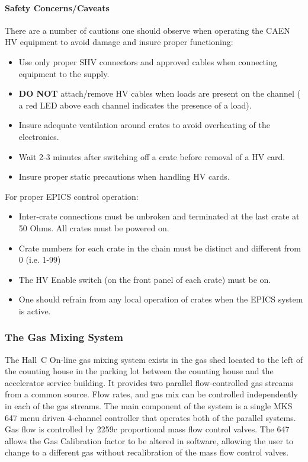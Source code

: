 \paragraph{Safety Concerns/Caveats}

There are a number of cautions one should observe when operating
the CAEN HV equipment to avoid damage and insure proper functioning:

\begin{itemize}
\item{Use only proper SHV connectors and approved cables when
connecting equipment to the supply.}
\item{{\bf DO NOT} attach/remove HV cables when loads are present on the
channel ( a red LED above each channel indicates the presence of a
load).}
\item{Insure adequate ventilation around crates to avoid overheating
of the electronics.}
\item{Wait 2-3 minutes after switching off a crate before removal of a
HV card.}
\item{Insure proper static precautions when handling HV cards.}
\end{itemize}

For proper EPICS control operation:

\begin{itemize}
\item{Inter-crate connections must be unbroken and terminated at the
last crate at 50 Ohms.  All crates must be powered on.}
\item{Crate numbers for each crate in the chain must be distinct and
different from 0 (i.e. 1-99)}
\item{The HV Enable switch (on the front panel of each crate) must be on.}
\item{One should refrain from any local operation of crates when the
EPICS system is active.}
\end{itemize}

\subsubsection{The Gas Mixing System}

The Hall~C On-line gas mixing system exists in the gas shed located
to the left of the counting house in the parking lot between the counting house
and the accelerator service building.
It provides two parallel
flow-controlled gas streams from a common source.  Flow rates, and gas mix
can be controlled independently in each of the gas streams.  The main
component of the system is a single MKS 647 menu driven 4-channel
controller that operates both of the parallel systems.  Gas flow is
controlled by 2259c proportional mass flow control valves.  The 647 allows
the Gas Calibration factor to be altered in software, allowing the user to
change to a different gas without recalibration of the mass flow control
valves.

